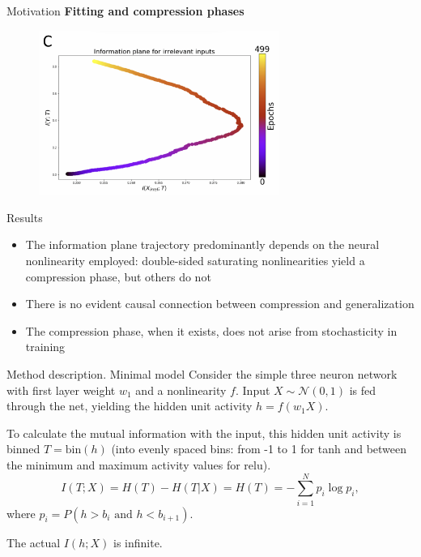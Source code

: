 \documentclass[13pt]{beamer}				\usepackage{graphicx}
\begin{document}
\begin{frame}{Motivation}
\textbf{Fitting and compression phases}
\begin{figure}[h!]
    \includegraphics[width=0.7\textwidth, trim={0 0 0 0cm},clip]{images/InfB.PNG}
\end{figure}
\end{frame}

\begin{frame}{Results}
\begin{itemize}
    \item The information plane trajectory predominantly depends on the neural nonlinearity employed: double-sided saturating nonlinearities yield a compression phase, but others do not 
    \item There is no evident causal connection between compression and generalization
    \item The compression phase, when it exists, does not arise from stochasticity in training
\end{itemize}
\end{frame}

\begin{frame}{Method description. Minimal model}
Consider the simple three neuron
network with first layer weight $w_1$ and a nonlinearity $f$. Input $X \sim \mathcal{N}(0, 1)$ is fed through the net, yielding
the hidden unit activity $h = f (w_1 X)$. 

To calculate the mutual information with the input, this hidden unit activity is binned $T = \text{bin}(h)$ (into evenly spaced bins: from -1 to 1 for tanh and between the minimum and maximum activity values for relu).
$$I(T ; X) = H(T) - H(T | X) = H(T) = -\sum\limits_{i=1}^{N} p_i \log p_i,$$
where $p_i = P(h > b_i \text{ and } h < b_{i + 1})$.

The actual $I(h; X)$ is infinite.
\end{frame}
\end{document}
